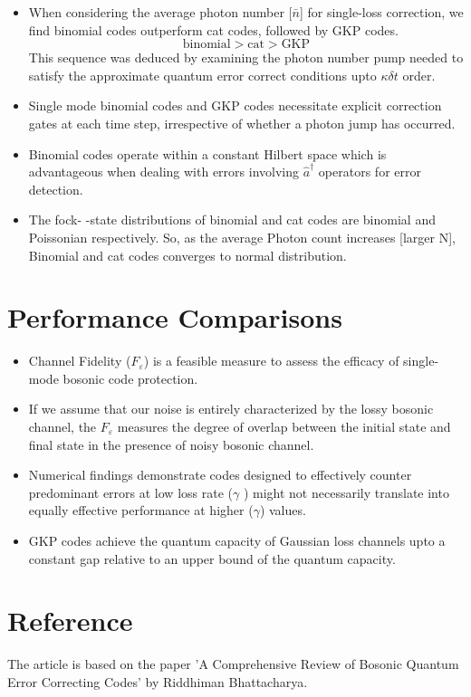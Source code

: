 \documentclass[english]{article}
\begin{document}
\begin{itemize}
\item When considering the average photon number [$\bar n$] for single-loss correction, we find binomial codes outperform cat codes, followed by GKP codes. \\
$$\text{binomial} > \text{cat} > \text{GKP}$$
This sequence was deduced by examining the photon number pump needed to satisfy the approximate quantum error correct conditions upto $\kappa\delta t$ order.

\item Single mode binomial codes and GKP codes necessitate explicit correction gates at each time step, irrespective of whether a photon jump has occurred. 

\item Binomial codes operate within a constant Hilbert space which is advantageous when dealing with errors involving $\hat{a}^\dag$ operators for error detection.
\item The fock- -state distributions of binomial and cat codes are binomial and Poissonian respectively. So, as the average Photon count increases [larger N],  Binomial and cat codes converges to normal distribution.

\end{itemize}

\section*{Performance Comparisons}

\begin{itemize}
\item Channel Fidelity ($F_\varepsilon$) is a feasible measure to assess the efficacy of single-mode bosonic code protection.
\item If we assume that our noise is entirely characterized by the lossy bosonic channel, the $F_\varepsilon$ measures the degree of overlap between the initial state and final state in the presence of noisy bosonic channel.
\item  Numerical findings demonstrate codes designed to effectively counter predominant errors at low loss rate ($\gamma$ ) might not necessarily translate into equally effective performance at higher ($\gamma$) values. 
\item GKP codes achieve the quantum capacity of Gaussian loss channels upto a constant gap relative to an upper bound of the quantum capacity.
\end{itemize}

\section*{Reference}

The article is based on the paper 'A Comprehensive Review of Bosonic Quantum Error Correcting Codes' by Riddhiman Bhattacharya.
\end{document}
